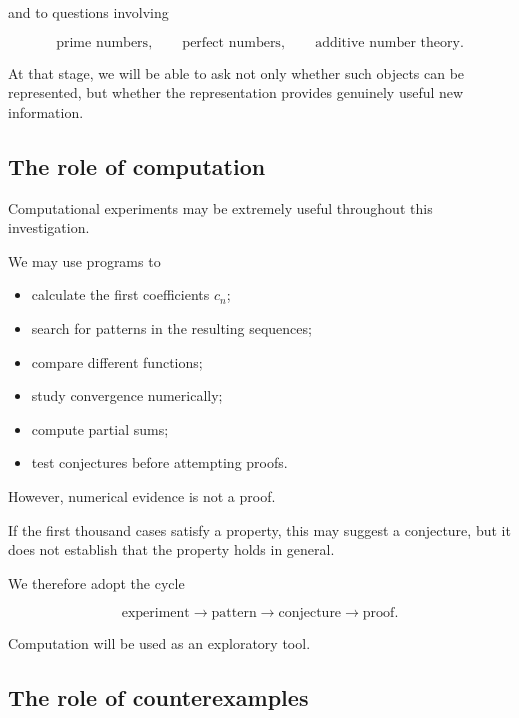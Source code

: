 and to questions involving

\[
\text{prime numbers},
\qquad
\text{perfect numbers},
\qquad
\text{additive number theory}.
\]

At that stage, we will be able to ask not only whether such objects can be
represented, but whether the representation provides genuinely useful new
information.

\subsection{The role of computation}

Computational experiments may be extremely useful throughout this
investigation.

We may use programs to

\begin{itemize}

    \item calculate the first coefficients \(c_n\);

    \item search for patterns in the resulting sequences;

    \item compare different functions;

    \item study convergence numerically;

    \item compute partial sums;

    \item test conjectures before attempting proofs.

\end{itemize}

However, numerical evidence is not a proof.

If the first thousand cases satisfy a property, this may suggest a
conjecture, but it does not establish that the property holds in general.

We therefore adopt the cycle

\[
\boxed{
\text{experiment}
\to
\text{pattern}
\to
\text{conjecture}
\to
\text{proof}.
}
\]

Computation will be used as an exploratory tool.

\subsection{The role of counterexamples}

